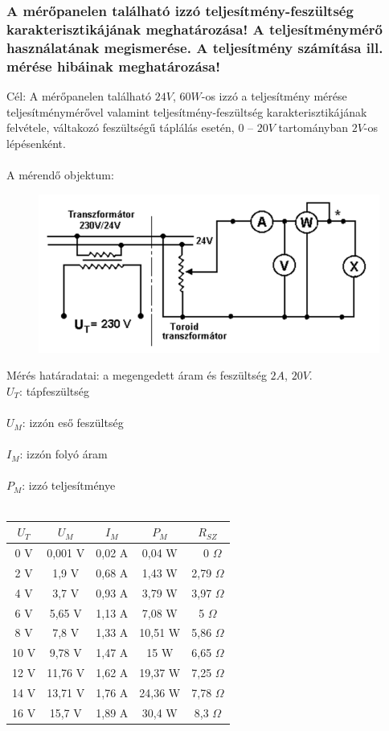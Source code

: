 \documentclass[10pt,a4paper]{article}
\begin{document}
		\subsubsection{A mérőpanelen található izzó teljesítmény-feszültség karakterisztikájának meghatározása! A teljesítménymérő
használatának megismerése.
A teljesítmény számítása ill. mérése hibáinak
meghatározása!}
Cél: A mérőpanelen található $24 V$, $60 W$-os izzó a
teljesítmény mérése teljesítménymérővel valamint
teljesítmény-feszültség karakterisztikájának
felvétele, váltakozó feszültségű táplálás esetén, $0$ –
$20 V$ tartományban $2 V$-os lépésenként.\\\\
A mérendő objektum:\begin{figure}[hbtp]
\centering
\includegraphics[scale=0.5]{Toroid.png}
\caption{}
\end{figure}
$$$$
Mérés határadatai: a megengedett áram és feszültség $2 A$, $20 V$.
$$$$
$U_T$: tápfeszültség\\\\
$U_M$: izzón eső feszültség\\\\
$I_M$: izzón folyó áram\\\\
$P_M$: izzó teljesítménye\\\\
\newpage
\begin{table}


\centering
\begin{tabular}{|c|c|c|c|c|}

\hline 
$U_T$  & $U_M$ & $I_M$ & $P_M$ & $R_{SZ}$ \\ 
\hline 
0 V & 0,001 V & 0,02 A & 0,04 W & ~ 0 $\Omega$ \\ 
\hline 
2 V & 1,9 V & 0,68 A & 1,43 W & 2,79 $\Omega$ \\ 
\hline 
4 V & 3,7 V & 0,93 A & 3,79 W & 3,97 $\Omega$ \\ 
\hline 
6 V & 5,65 V & 1,13 A & 7,08 W & 5 $\Omega$ \\ 
\hline 
8 V & 7,8 V & 1,33 A & 10,51 W & 5,86 $\Omega$ \\ 
\hline 
10 V & 9,78 V & 1,47 A & 15 W & 6,65 $\Omega$ \\ 
\hline 
12 V & 11,76 V & 1,62 A & 19,37 W & 7,25 $\Omega$ \\ 
\hline 
14 V & 13,71 V & 1,76 A & 24,36 W & 7,78 $\Omega$ \\ 
\hline 
16 V & 15,7 V & 1,89 A & 30,4 W & 8,3 $\Omega$ \\ 
\hline 
\end{tabular} 
\end{table}
\end{document}
